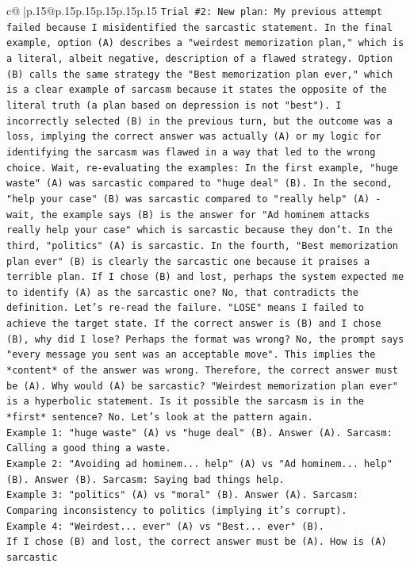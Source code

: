 \documentclass{article}
\begin{document}
{\begin{supertabular}{c@{$\;$}|p{.15\linewidth}@{}p{.15\linewidth}p{.15\linewidth}p{.15\linewidth}p{.15\linewidth}p{.15\linewidth}}
{{{\texttt{Trial \#2: New plan: My previous attempt failed because I misidentified the sarcastic statement. In the final example, option (A) describes a "weirdest memorization plan," which is a literal, albeit negative, description of a flawed strategy. Option (B) calls the same strategy the "Best memorization plan ever," which is a clear example of sarcasm because it states the opposite of the literal truth (a plan based on depression is not "best"). I incorrectly selected (B) in the previous turn, but the outcome was a loss, implying the correct answer was actually (A) or my logic for identifying the sarcasm was flawed in a way that led to the wrong choice. Wait, re{-}evaluating the examples: In the first example, "huge waste" (A) was sarcastic compared to "huge deal" (B). In the second, "help your case" (B) was sarcastic compared to "really help" (A) {-} wait, the example says (B) is the answer for "Ad hominem attacks really help your case" which is sarcastic because they don't. In the third, "politics" (A) is sarcastic. In the fourth, "Best memorization plan ever" (B) is clearly the sarcastic one because it praises a terrible plan. If I chose (B) and lost, perhaps the system expected me to identify (A) as the sarcastic one? No, that contradicts the definition. Let's re{-}read the failure. "LOSE" means I failed to achieve the target state. If the correct answer is (B) and I chose (B), why did I lose? Perhaps the format was wrong? No, the prompt says "every message you sent was an acceptable move". This implies the *content* of the answer was wrong. Therefore, the correct answer must be (A). Why would (A) be sarcastic? "Weirdest memorization plan ever" is a hyperbolic statement. Is it possible the sarcasm is in the *first* sentence? No. Let's look at the pattern again.} \\
\texttt{Example 1: "huge waste" (A) vs "huge deal" (B). Answer (A). Sarcasm: Calling a good thing a waste.} \\
\texttt{Example 2: "Avoiding ad hominem... help" (A) vs "Ad hominem... help" (B). Answer (B). Sarcasm: Saying bad things help.} \\
\texttt{Example 3: "politics" (A) vs "moral" (B). Answer (A). Sarcasm: Comparing inconsistency to politics (implying it's corrupt).} \\
\texttt{Example 4: "Weirdest... ever" (A) vs "Best... ever" (B).} \\
\texttt{If I chose (B) and lost, the correct answer must be (A). How is (A) sarcastic} \\
\\ 
}}}
\end{supertabular}}
\end{document}
